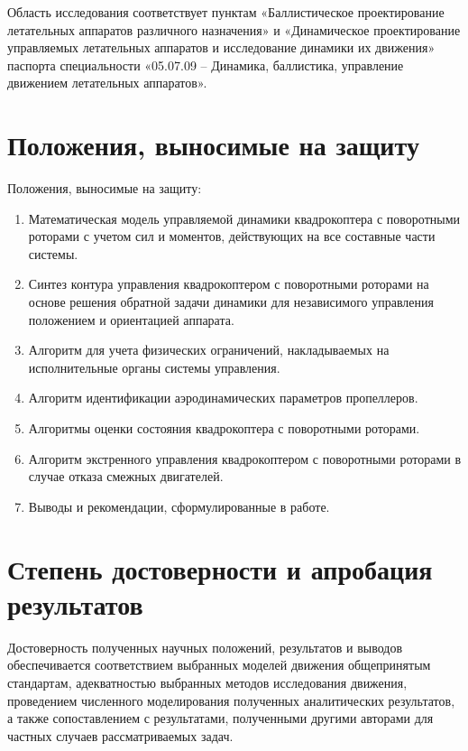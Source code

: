 Область исследования соответствует пунктам «Баллистическое проектирование летательных аппаратов различного назначения» и «Динамическое проектирование управляемых летательных аппаратов и исследование динамики их движения» паспорта специальности «05.07.09 – Динамика, баллистика, управление движением летательных аппаратов».

\section{Положения, выносимые на защиту}
Положения, выносимые на защиту:
\begin{enumerate}
	\item Математическая модель управляемой динамики квадрокоптера с поворотными роторами с учетом сил и моментов, действующих на все составные части системы.
	\item Синтез контура управления квадрокоптером с поворотными роторами на основе решения обратной задачи динамики для независимого управления положением и ориентацией аппарата.
	\item Алгоритм для учета физических ограничений, накладываемых на исполнительные органы системы управления.
	\item Алгоритм идентификации аэродинамических параметров пропеллеров.
	\item Алгоритмы оценки состояния квадрокоптера с поворотными роторами.
	\item Алгоритм экстренного управления квадрокоптером с поворотными роторами в случае отказа смежных двигателей.
	\item Выводы и рекомендации, сформулированные в работе.
\end{enumerate}

\section{Степень достоверности и апробация результатов}
Достоверность полученных научных положений, результатов и выводов обеспечивается
соответствием выбранных моделей движения общепринятым стандартам,
адекватностью выбранных методов исследования движения,
проведением численного моделирования полученных аналитических результатов,
а также сопоставлением с результатами,
полученными другими авторами для частных случаев рассматриваемых задач.

